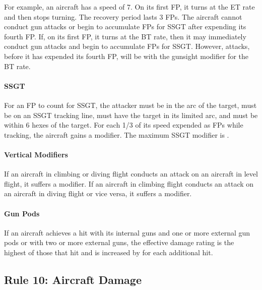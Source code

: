 \documentclass[10pt]{article}
\begin{document}
For example, an aircraft has a speed of 7. On its first FP, it turns at the ET rate and then stops turning. The recovery period lasts 3 FPs. The aircraft cannot conduct gun attacks or begin to accumulate FPs for SSGT after expending its fourth FP. If, on its first FP, it turns at the BT rate, then it may immediately conduct gun attacks and begin to accumulate FPs for SSGT. However, attacks, before it has expended its fourth FP, will be with the gunsight modifier for the BT rate.

\paragraph{SSGT} For an FP to count for SSGT, the attacker must be in the  arc of the target, must be on an SSGT tracking line,  must have the target in its limited arc, and must be within 6 hexes of the target. For each 1/3 of its speed expended as FPs while tracking, the aircraft gains a  modifier. The maximum SSGT modifier is .

\paragraph{Vertical Modifiers} If an aircraft in climbing or diving flight conducts an attack on an aircraft in level flight, it suffers a  modifier. If an aircraft in climbing flight conducts an attack on an aircraft in diving flight or vice versa, it suffers a  modifier.

\paragraph{Gun Pods} If an aircraft achieves a hit with its internal guns and one or more external gun pods or with two or more external guns, the effective damage rating is the highest of those that hit and is increased by  for each additional hit.

\subsection{Rule 10: Aircraft Damage}
\end{document}
